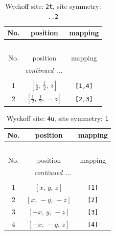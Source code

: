 \documentclass[fleqn,8pt]{jsarticle}
\begin{document}
\begin{longtable}{ccc}
\caption{Wyckoff site: {\tt 2t}, site symmetry: {\tt ..2}}
 \\
 \hline \hline
No. & position & mapping \\ \hline \endfirsthead

\multicolumn{2}{l}{\tablename\ \thetable{}} \\
 \hline \hline
No. & position & mapping \\ \hline \endhead

 \hline \hline
\multicolumn{2}{r}{\footnotesize\it continued ...} \\ \endfoot

 \hline \hline
\multicolumn{2}{r}{} \\ \endlastfoot

1 & $\left[ \frac{1}{2},\, \frac{1}{2},\, z \right]$ & {\tt [1,4]} \\ \hline
2 & $\left[ \frac{1}{2},\, \frac{1}{2},\, - z \right]$ & {\tt [2,3]} \\
\end{longtable}
\renewcommand{\arraystretch}{1.2}
\begin{longtable}{ccc}
\caption{Wyckoff site: {\tt 4u}, site symmetry: {\tt 1}}
 \\
 \hline \hline
No. & position & mapping \\ \hline \endfirsthead

\multicolumn{2}{l}{\tablename\ \thetable{}} \\
 \hline \hline
No. & position & mapping \\ \hline \endhead

 \hline \hline
\multicolumn{2}{r}{\footnotesize\it continued ...} \\ \endfoot

 \hline \hline
\multicolumn{2}{r}{} \\ \endlastfoot

1 & $\left[ x,\, y,\, z \right]$ & {\tt [1]} \\ \hline
2 & $\left[ x,\, - y,\, - z \right]$ & {\tt [2]} \\ \hline
3 & $\left[ - x,\, y,\, - z \right]$ & {\tt [3]} \\ \hline
4 & $\left[ - x,\, - y,\, z \right]$ & {\tt [4]} \\
\end{longtable}
\end{document}
